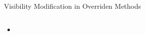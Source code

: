 \documentclass{beamer}
\begin{document}
\begin{frame}[fragile]{Visibility Modification in Overriden Methods}


\begin{lstlisting}[language=Java]

\end{lstlisting}

\begin{itemize}
\item
\end{itemize}


\end{frame}








\end{document}
